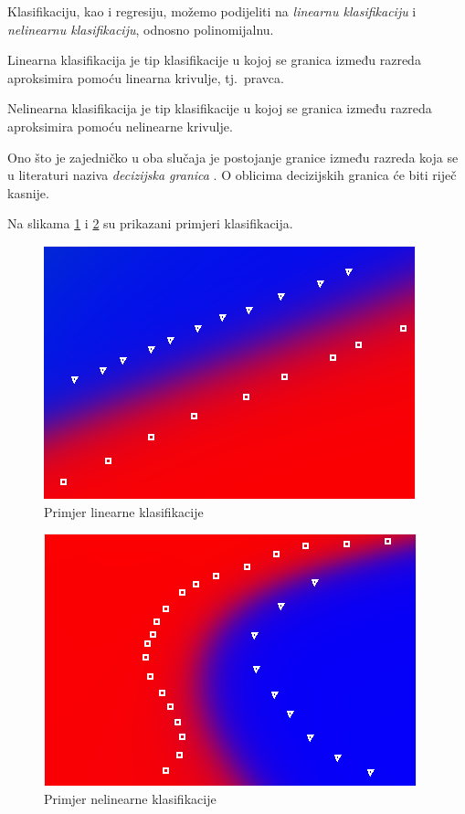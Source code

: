 \documentclass[times, utf8, zavrsni]{fer}
\begin{document}
\bigskip

Klasifikaciju, kao i regresiju, možemo podijeliti na \textit{linearnu klasifikaciju} i \textit{nelinearnu klasifikaciju}, odnosno polinomijalnu.

Linearna klasifikacija  je tip klasifikacije u kojoj se granica između razreda aproksimira pomoću linearna krivulje, tj.\ pravca.

Nelinearna klasifikacija  je tip klasifikacije u kojoj se granica između razreda aproksimira pomoću nelinearne krivulje.

Ono što je zajedničko u oba slučaja je postojanje granice između razreda koja se u literaturi naziva \textit{decizijska granica} \citep{cupicANN}. O oblicima decizijskih granica će biti riječ kasnije.

Na slikama \ref{fig:linear-classification} i \ref{fig:non-linear-classification} su prikazani primjeri klasifikacija.

\begin{figure}[H]
    \centering
    \includegraphics[scale=0.8]{img/linear-classification.png}
    \caption[Caption for LOF]{Primjer linearne klasifikacije\footnotemark}
    \label{fig:linear-classification}
\end{figure}

\begin{figure}[H]
    \centering
    \includegraphics[scale=0.8]{img/non-linear-classification.png}
    \caption[Caption for LOF]{Primjer nelinearne klasifikacije\footnotemark}
    \label{fig:non-linear-classification}
\end{figure}
\end{document}
